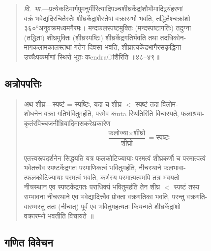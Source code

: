 \documentclass[11pt,a4paper]{article}
\newcommand{\dev}[1]{{\devanagarifont #1}}
\newenvironment{vyakhya}{%
  \begin{quote}
  \small
  \setlength{\leftmargin}{1em}
  \devanagarifont
}{\end{quote}}
\newcommand{\skt}[1]{{\devanagarifont #1}}
\begin{document}
\begin{vyakhya}
\textit{वि.\ भा.}—\skt{प्रत्येकटिमार्गपुमनुर्मीरित्यादिपञ्चशीघ्रकेंद्रांशौभौमादिद्वयंहरणां}\\
\skt{वक्रं भवेद्यदिरचितैस्तैः शीघ्रकेंद्रांशैस्तेषां वक्रारम्भौ भवति, तद्धितैश्चक्रांशो}\\
\skt{३६०°अनुवक्रमध्यमगैरमः। मन्दफलस्पष्टमुक्तिः (मन्दस्पष्टागतिः) तदुग्ना}\\
\skt{(तद्धिता) शीघ्रमुक्तिः (शीघ्रस्पष्टिः) शीघ्रकेंद्रगतिर्भवति तथा तदधिकोन-}\\
\skt{मागकलामकालस्तथा गतेन दिवसा भवति, शीघ्रात्यकेंद्रभागैरसकृद्धिना-}\\
\skt{उच्चैःपकर्माणां स्थिरो भूतः कendraांशैरिति ॥४८--४९॥}
\end{vyakhya}

\subsection{\dev{अत्रोपपत्तिः}}

\begin{vyakhya}
\skt{अथ शीघ्र—स्पष्टं = स्पष्टिः, यदा च शीघ्र $<$ स्पष्टं तदा विलोम-}\\
\skt{शोधनेन वक्रा गतिर्भवितुमहंति, परमेव कuta स्थितिरिति विचारयते, फलाश्रया-}\\
\skt{कृतंरविच्चजनीभ्रियादिमासकरेःप्रकारेण}
\begin{equation*}
\frac{\text{फलोज्या} \times \text{शीघ्रो}}{\text{शीघ्रो}} = \text{स्पष्टः}
\end{equation*}

\skt{एतत्त्वरूपदर्शनेन सिद्धयति यत्र फलकोटिज्यायाः परमत्वं शीघ्रकर्णौ च परमात्पत्वं}\\
\skt{भवेतत्त्वैव स्पष्टकेंद्रगतः परमाणिकत्वं भवितुमहंति, नीचरथाने फलभावा-}\\
\skt{त्फलकोटिज्यायाः परमत्वं भवति, कर्णस्य परमात्पत्वमपि तत्र भवयतो}\\
\skt{नीचस्थान एव स्पष्टकेंद्रगतः पराधिक्यं भवितुमहंति तेन शीघ्र $<$ स्पष्टं तस्य}\\
\skt{सम्भावना नीचरथाने एव भवेद्यादित्त्वैव प्रोक्ता वक्रगतिका भवति, परन्तु वक्रगति-}\\
\skt{वारम्मस्तु ततः (नीचात्) पूर्वं एव भवितुमहत्यतः कियन्मते शीघ्रकेंद्रांशो}\\
\skt{वक्रारम्भो भवतीति विचायते ॥}
\end{vyakhya}

\subsection{\dev{गणित विवेचन}}
\end{document}
